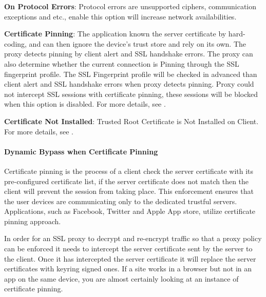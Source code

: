 \textbf{On Protocol Errors}: Protocol errors are unsupported ciphers, communication exceptions and etc., enable this option will increase network availabilities. 


\textbf{Certificate Pinning}: The application known the server certificate by hard-coding, and can then ignore the device's trust store and rely on its own. 
The proxy detects pinning by client alert and SSL handshake errors. The proxy can also determine whether the current connection is Pinning through the SSL fingerprint profile. 
The SSL Fingerprint profile will be checked in advanced than client alert and SSL handshake errors when proxy detects pinning. 
Proxy could not intercept SSL sessions with certificate pinning, these sessions will be blocked when this option is disabled. 
For more details, see \textbf{\hyperlink{link:Dynamic Bypass when Certificate Pinning}{\color{linkblue}{Dynamic Bypass when Certificate Pinning}}}.


\textbf{Certificate Not Installed}: Trusted Root Certificate is Not Installed on Client.  
For more details, see \textbf{\hyperlink{link:Dynamic Bypass when Certificate is Not Installed}{\color{linkblue}{Dynamic Bypass when Certificate is Not Installed}}}.

\hypertarget{link:Dynamic Bypass when Certificate Pinning}{\paragraph{Dynamic Bypass when Certificate Pinning}}
\label{sec:decrypt:profile:decryptionprofile:bypass:pinning}

Certificate pinning is the process of a client check the server certificate with its pre-configured certificate list, if the server certificate does not match then the client will prevent the session from taking place. This enforcement ensures that the user devices are communicating only to the dedicated trustful servers. Applications, such as Facebook, Twitter and Apple App store, utilize certificate pinning approach.


In order for an SSL proxy to decrypt and re-encrypt traffic so that a proxy policy can be enforced it needs to intercept the server certificate sent by the server to the client. Once it has intercepted the server certificate it will replace the server certificates with keyring signed ones. If a site works in a browser but not in an app on the same device, you are almost certainly looking at an instance of certificate pinning.


